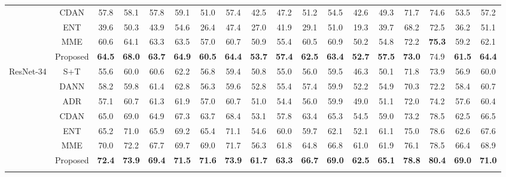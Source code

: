\documentclass[a4paper,conference]{IEEEtran}
\begin{document}
\begin{table*}[!t]
\begin{tabular}{c|c|c@{\,\;}c@{\,\;}c@{\,\;}c@{\,\;}c@{\,\;}c@{\,\;}c@{\,\;}c@{\,\;}c@{\,\;}c@{\,\;}c@{\,\;}c@{\,\;}c@{\,\;}c | c@{\,\;}c}
& CDAN & 57.8 & 58.1 & 57.8 & 59.1 & 51.0 & 57.4 & 42.5 & 47.2 & 51.2 & 54.5 & 42.6 & 49.3 & 71.7 & 74.6 & 53.5 & 57.2\\
& ENT & 39.6 & 50.3 & 43.9 & 54.6 & 26.4 & 47.4 & 27.0 & 41.9 & 29.1 & 51.0 & 19.3 & 39.7 & 68.2 & 72.5 & 36.2 & 51.1\\
& MME & 60.6 & 64.1 & 63.3 & 63.5 & 57.0 & 60.7 & 50.9 & 55.4 & 60.5 & 60.9 & 50.2 & 54.8 & 72.2 & \textbf{75.3} & 59.2 & 62.1 \\
& Proposed & \textbf{64.5} & \textbf{68.0} & \textbf{63.7} & \textbf{64.9} & \textbf{60.5} & \textbf{64.4} & \textbf{53.7} & \textbf{57.4} & \textbf{62.5} & \textbf{63.4} & \textbf{52.7} & \textbf{57.5} & \textbf{73.0} & 74.9 & \textbf{61.5} & \textbf{64.4}\\
\hline\hline
\multirow{7}{*}{ResNet-34} & S+T & 55.6 & 60.0 & 60.6 & 62.2 & 56.8 & 59.4 & 50.8 & 55.0 & 56.0 & 59.5 & 46.3 & 50.1 & 71.8 & 73.9 & 56.9 & 60.0\\
& DANN & 58.2 & 59.8 & 61.4 & 62.8 & 56.3 & 59.6 & 52.8 & 55.4 & 57.4 & 59.9 & 52.2 & 54.9 & 70.3 & 72.2 & 58.4 & 60.7\\
& ADR & 57.1 & 60.7 & 61.3 & 61.9 & 57.0 & 60.7 & 51.0 & 54.4 & 56.0 & 59.9 & 49.0 & 51.1 & 72.0 & 74.2 & 57.6 & 60.4\\
& CDAN & 65.0 & 69.0 & 64.9 & 67.3 & 63.7 & 68.4 & 53.1 & 57.8 & 63.4 & 65.3 & 54.5 & 59.0 & 73.2 & 78.5 & 62.5 & 66.5\\
& ENT & 65.2 & 71.0 & 65.9 & 69.2 & 65.4 & 71.1 & 54.6 & 60.0 & 59.7 & 62.1 & 52.1 & 61.1 & 75.0 & 78.6 & 62.6 & 67.6\\
& MME & 70.0 & 72.2 & 67.7 & 69.7 & 69.0 & 71.7 & 56.3 & 61.8 & 64.8 & 66.8 & 61.0 & 61.9 & 76.1 & 78.5 & 66.4 & 68.9\\
& Proposed & \textbf{72.4} & \textbf{73.9} & \textbf{69.4} & \textbf{71.5} & \textbf{71.6} & \textbf{73.9} & \textbf{61.7} & \textbf{63.3} & \textbf{66.7} & \textbf{69.0} & \textbf{62.5} & \textbf{65.1} & \textbf{78.8} & \textbf{80.4} & \textbf{69.0} & \textbf{71.0}\\
\Xhline{4\arrayrulewidth}
\end{tabular}
\label{tab:domainnet}
\end{table*}
\end{document}
